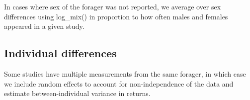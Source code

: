 \documentclass[
]{article}
\begin{document}
In cases where sex of the forager was not reported, we average over sex
differences using log\_mix() in proportion to how often males and
females appeared in a given study.

\hypertarget{individual-differences}{%
\subsection{Individual differences}\label{individual-differences}}

Some studies have multiple measurements from the same forager, in which
case we include random effects to account for non-independence of the
data and estimate between-individual variance in returns.
\end{document}
